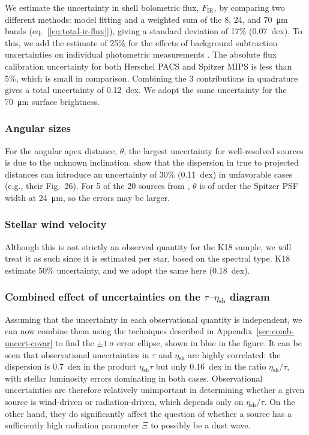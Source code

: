 \documentclass[useAMS, usenatbib, a4paper]{mnras}
\newcommand\shell{\ensuremath{_{\text{sh}}}}
\begin{document}
We estimate the uncertainty in shell bolometric flux,
\(F_{\text{IR}}\), by comparing two different methods: model fitting
\citep{Kobulnicky:2017a} and a weighted sum of the 8, 24, and
\SI{70}{\um} bands (eq.~[\ref{eq:total-ir-flux}]), giving a standard
deviation of 17\% (0.07~dex).  To this, we add the estimate of 25\%
for the effects of background subtraction uncertainties on individual
photometric measurements \citep{Kobulnicky:2017a}. The absolute flux
calibration uncertainty for both Herschel PACS \citep{Balog:2014a} and
Spitzer MIPS \citep{Engelbracht:2007a} is less than 5\%, which is
small in comparison. Combining the 3 contributions in quadrature gives
a total uncertainty of 0.12~dex.  We adopt the same uncertainty for
the \SI{70}{\um} surface brightness.

\subsubsection{Angular sizes}
\label{sec:angular-sizes}

For the angular apex distance, \(\theta\), the largest uncertainty for
well-resolved sources is due to the unknown inclination.
\citet{Tarango-Yong:2018a} show that the dispersion in true to
projected distances can introduce an uncertainty of \(30\%\)
(0.11~dex) in unfavorable cases (e.g., their Fig.~26).  For 5 of the
20 sources from \citet{Kobulnicky:2018a}, \(\theta\) is of order the
Spitzer PSF width at \SI{24}{\um}, so the errors may be larger.

\subsubsection{Stellar wind velocity}
\label{sec:stell-wind-veloc}

Although this is not strictly an observed quantity for the K18 sample,
we will treat it as such since it is estimated per star, based on the
spectral type.  K18 estimate 50\% uncertainty, and we adopt the same
here (0.18~dex).


\subsubsection{Combined effect of uncertainties on the
  \(\tau\)--\(\eta\shell\) diagram}
\label{sec:comb-effect-uncert}

Assuming that the uncertainty in each observational quantity is
independent, we can now combine them using the techniques described in
Appendix~\ref{sec:comb-uncert-covar} to find the \(\pm 1~\sigma\) error
ellipse, shown in blue in the figure.  It can be seen that
observational uncertainties in \(\tau\) and \(\eta\shell\) are highly
correlated: the dispersion is \SI{0.7}{dex} in the product
\(\eta\shell \tau\) but only \SI{0.16}{dex} in the ratio
\(\eta\shell/\tau\), with stellar luminosity errors dominating in both
cases.  Observational uncertainties are therefore relatively
unimportant in determining whether a given source is wind-driven or
radiation-driven, which depends only on \(\eta\shell/\tau\).  On the other
hand, they do significantly affect the question of whether a source
has a sufficiently high radiation parameter \(\Xi\) to possibly be a
dust wave.
\end{document}
